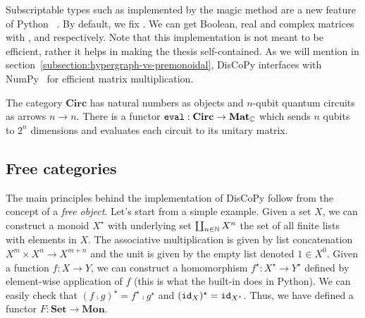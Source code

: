 \begin{python}
Subscriptable types such as  implemented by the magic method  are a new feature of Python ~\cite{Levkivskyi17}.
By default, we fix .
We can get Boolean, real and complex matrices with ,  and  respectively.
Note that this implementation is not meant to be efficient, rather it helps in making the thesis self-contained.
As we will mention in section~\ref{subsection:hypergraph-vs-premonoidal}, DisCoPy interfaces with NumPy~\cite{VanDerWaltEtAl11} for efficient matrix multiplication.
\end{python}

\begin{example}
The category $\mathbf{Circ}$ has natural numbers as objects and $n$-qubit quantum circuits as arrows $n \to n$.
There is a functor $\mathtt{eval} : \mathbf{Circ} \to \mathbf{Mat}_{\mathbb{C}}$ which sends $n$ qubits to $2^n$ dimensions and evaluates each circuit to its unitary matrix.
\end{example}

\subsection{Free categories}\label{subsection:free-categories}

The main principles behind the implementation of DisCoPy follow from the concept of a \emph{free object}.
Let's start from a simple example.
Given a set $X$, we can construct a monoid $X^\star$ with underlying set $\coprod_{n \in \mathbb{N}} X^n$ the set of all finite lists with elements in $X$.
The associative multiplication is given by list concatenation $X^m \times X^n \to X^{m + n}$ and the unit is given by the empty list denoted $1 \in X^0$.
Given a function $f : X \to Y$, we can construct a homomorphism $f^\star : X^\star \to Y^\star$ defined by element-wise application of $f$ (this is what the built-in  does in Python).
We can easily check that $(f \fcmp g)^\star = f^\star \fcmp g^\star$ and $(\mathtt{id}_X)^\star = \mathtt{id}_{X^\star}$.
Thus, we have defined a functor $F : \mathbf{Set} \to \mathbf{Mon}$.

